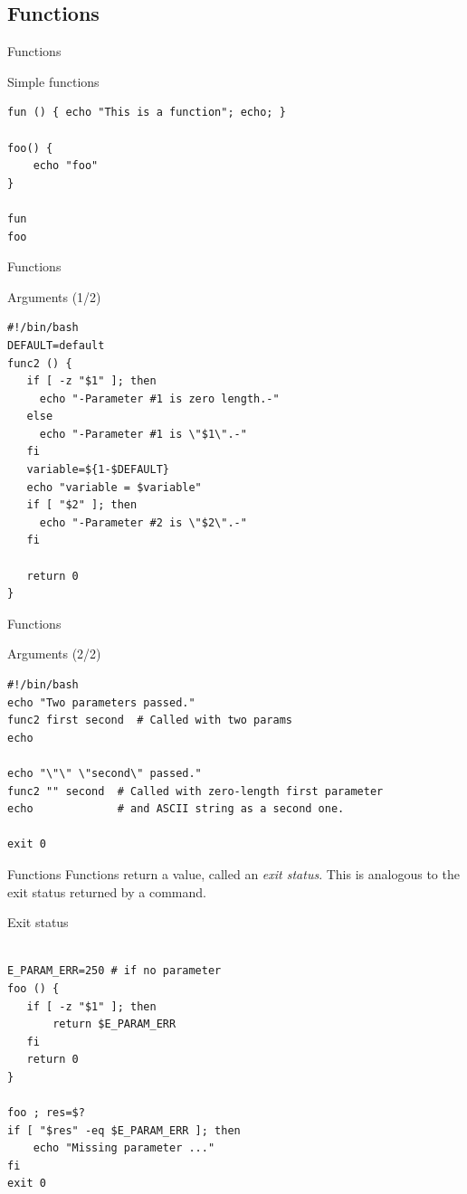 \documentclass[xcolor=dvipsnames, 10pt, presentation,aspectratio=169]{beamer}
\begin{document}
\subsection{Functions}
\label{sec:orgc87dd95}
\begin{frame}[label={sec:orge5eeb0e},fragile]{Functions}
 \begin{block}{Simple functions}
\begin{verbatim}
fun () { echo "This is a function"; echo; }

foo() {
    echo "foo"
}

fun
foo
\end{verbatim}
\end{block}
\end{frame}
\begin{frame}[label={sec:org1c52026},fragile]{Functions}
 \begin{block}{Arguments (1/2)}
\begin{verbatim}
#!/bin/bash
DEFAULT=default 
func2 () {
   if [ -z "$1" ]; then
     echo "-Parameter #1 is zero length.-" 
   else
     echo "-Parameter #1 is \"$1\".-"
   fi
   variable=${1-$DEFAULT} 
   echo "variable = $variable"
   if [ "$2" ]; then
     echo "-Parameter #2 is \"$2\".-"
   fi

   return 0
}
\end{verbatim}
\end{block}
\end{frame}
\begin{frame}[label={sec:orgb20e73e},fragile]{Functions}
 \begin{block}{Arguments (2/2)}
\begin{verbatim}
#!/bin/bash
echo "Two parameters passed."   
func2 first second  # Called with two params
echo

echo "\"\" \"second\" passed."
func2 "" second  # Called with zero-length first parameter
echo             # and ASCII string as a second one.

exit 0
\end{verbatim}
\end{block}
\end{frame}
\begin{frame}[label={sec:org6161f02},fragile]{Functions}
 Functions return a value, called an \emph{exit status}. This is analogous to
the exit status returned by a command.
\begin{block}{Exit status}
\begin{verbatim}

E_PARAM_ERR=250 # if no parameter
foo () {
   if [ -z "$1" ]; then
       return $E_PARAM_ERR
   fi
   return 0
}

foo ; res=$?
if [ "$res" -eq $E_PARAM_ERR ]; then
    echo "Missing parameter ..."
fi
exit 0
\end{verbatim}
\end{block}
\end{frame}
\end{document}
